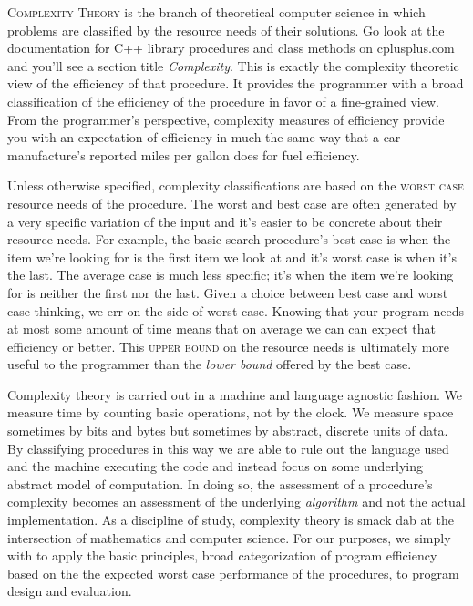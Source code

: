 \documentclass[]{tufte-handout}
\begin{document}
\textsc{Complexity Theory} is the branch of theoretical computer science in which problems are classified by the resource needs of their solutions.  Go look at the documentation for C++ library procedures and class methods on cplusplus.com and you'll see a section title \textit{Complexity}.  This is exactly the complexity theoretic view of the efficiency of that procedure. It provides the programmer with a broad classification of the efficiency of the procedure in favor of a fine-grained view. From the programmer's perspective, complexity measures of efficiency provide you with an expectation of efficiency in much the same way that a car manufacture's reported miles per gallon does for fuel efficiency.

Unless otherwise specified, complexity classifications are based on the \textsc{worst case} resource needs of the procedure. The worst and best case are often generated by a very specific variation of the input and it's easier to be concrete about their resource needs. For example, the basic search procedure's best case is when the item we're looking for is the first item we look at and it's worst case is when it's the last. The average case is much less specific; it's when the item we're looking for is neither the first nor the last.  Given a choice between best case and worst case thinking, we err on the side of worst case.  Knowing that your program needs at most some amount of time means that on average we can can expect that efficiency or better.  This \textsc{upper bound} on the resource needs is ultimately more useful to the programmer than the \textit{lower bound} offered by the best case. 

Complexity theory is carried out in a machine and language agnostic fashion. We measure time by counting basic operations, not by the clock. We measure space sometimes by bits and bytes but sometimes by abstract, discrete units of data. By classifying procedures in this way we are able to rule out the language used and the machine executing the code and instead focus on some underlying abstract model of computation. In doing so, the assessment of a procedure's complexity becomes an assessment of the underlying \textit{algorithm} and not the actual implementation. As a discipline of study, complexity theory is smack dab at the intersection of mathematics and computer science. For our purposes, we simply with to apply the basic principles, broad categorization of program efficiency based on the the expected worst case performance of the procedures, to program design and evaluation. 
\end{document}
